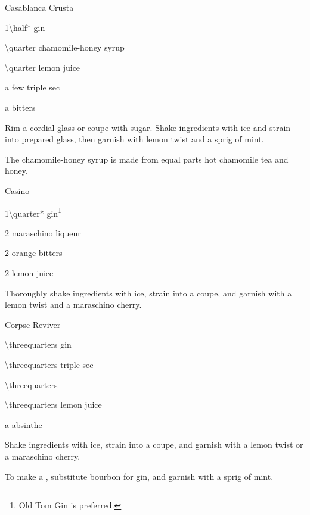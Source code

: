 \begin{Cocktail}{Casablanca Crusta}
  \begin{Ingredients}
  \item \SI{1\half*}{\oz} gin
  \item \SI{\quarter}{\oz} chamomile-honey syrup
  \item \SI{\quarter}{\oz} lemon juice
  \item a few \si{\dashes} triple sec
  \item a \si{\dash} bitters
  \end{Ingredients}
  
  \begin{Instructions}
	Rim a cordial glass or coupe with sugar.  Shake ingredients with ice and strain into prepared glass, then garnish with lemon twist and a sprig of mint.
	
	The chamomile-honey syrup is made from equal parts hot chamomile tea and honey.
  \end{Instructions}
\end{Cocktail}

\begin{Cocktail}{Casino}
  \begin{Ingredients}
  \item \SI{1\quarter*}{\oz} gin\footnote{Old Tom Gin is preferred.}
  \item \SI{2}{\tsp} maraschino liqueur
  \item \SI{2}{\tsp} orange bitters
  \item \SI{2}{\tsp} lemon juice
  \item 
  \end{Ingredients}
  
  \begin{Instructions}
	Thoroughly shake ingredients with ice, strain into a coupe, and garnish with a lemon twist and a maraschino cherry.
  \end{Instructions}
\end{Cocktail}

\begin{Cocktail}{Corpse Reviver }
  \begin{Ingredients}
  \item \SI{\threequarters}{\oz} gin
  \item \SI{\threequarters}{\oz} triple sec
  \item \SI{\threequarters}{\oz} \Lillet
  \item \SI{\threequarters}{\oz} lemon juice
  \item a \si{\dash} absinthe
  \end{Ingredients}
  
  \begin{Instructions}\vspace{-3ex}
	Shake ingredients with ice, strain into a coupe, and garnish with a lemon twist or a maraschino cherry.
	
	To make a , substitute bourbon for gin, and garnish with a sprig of mint.
  \end{Instructions}
\end{Cocktail}

